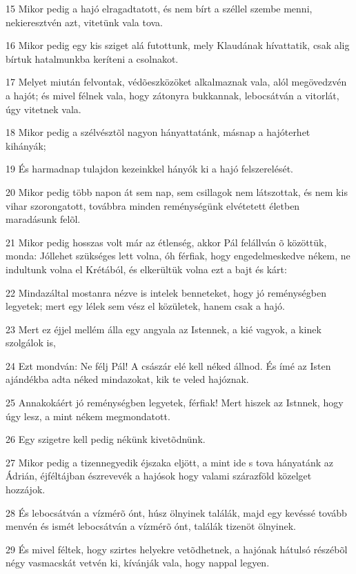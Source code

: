 \par 15 Mikor pedig a hajó elragadtatott, és nem bírt a széllel szembe menni, nekieresztvén azt, vitetünk vala tova.
\par 16 Mikor pedig egy kis sziget alá futottunk, mely Klaudának hívattatik, csak alig bírtuk hatalmunkba keríteni a csolnakot.
\par 17 Melyet miután felvontak, védõeszközöket alkalmaznak vala, alól megövedzvén a hajót; és mivel félnek vala, hogy zátonyra bukkannak, lebocsátván a vitorlát, úgy vitetnek vala.
\par 18 Mikor pedig a szélvésztõl nagyon hányattatánk, másnap a hajóterhet kihányák;
\par 19 És harmadnap tulajdon kezeinkkel hányók ki a hajó felszerelését.
\par 20 Mikor pedig több napon át sem nap, sem csillagok nem látszottak, és nem kis vihar szorongatott, továbbra minden reménységünk elvétetett életben maradásunk felõl.
\par 21 Mikor pedig hosszas volt már az étlenség, akkor Pál felállván õ közöttük, monda: Jóllehet szükséges lett volna, óh férfiak, hogy engedelmeskedve nékem, ne indultunk volna el Krétából, és elkerültük volna ezt a bajt és kárt:
\par 22 Mindazáltal mostanra nézve is intelek benneteket, hogy jó reménységben legyetek; mert egy lélek sem vész el közületek, hanem csak a hajó.
\par 23 Mert ez éjjel mellém álla egy angyala az Istennek, a kié vagyok, a kinek szolgálok is,
\par 24 Ezt mondván: Ne félj Pál! A császár elé kell néked állnod. És ímé az Isten ajándékba adta néked mindazokat, kik te veled hajóznak.
\par 25 Annakokáért jó reménységben legyetek, férfiak! Mert hiszek az Istnnek, hogy úgy lesz, a mint nékem megmondatott.
\par 26 Egy szigetre kell pedig nékünk kivetõdnünk.
\par 27 Mikor pedig a tizennegyedik éjszaka eljött, a mint ide s tova hányatánk az Ádrián, éjféltájban észrevevék a hajósok hogy valami szárazföld közelget hozzájok.
\par 28 És lebocsátván a vízmérõ ónt, húsz ölnyinek találák, majd egy kevéssé tovább menvén és ismét lebocsátván a vízmérõ ónt, találák tizenöt ölnyinek.
\par 29 És mivel féltek, hogy szirtes helyekre vetõdhetnek, a hajónak hátulsó részébõl négy vasmacskát vetvén ki, kívánják vala, hogy nappal legyen.
